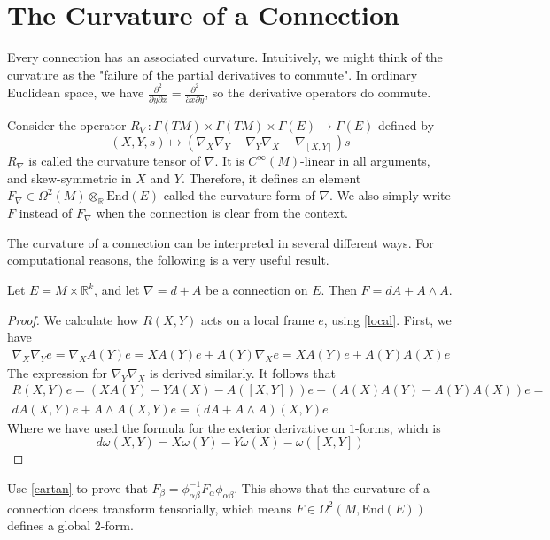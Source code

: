 \section{The Curvature of a Connection}

Every connection has an associated curvature. Intuitively, we might think of the curvature as the "failure of the partial derivatives to commute". In ordinary Euclidean space, we have $\frac{\partial^2}{\partial y\partial x}=\frac{\partial^2}{\partial x\partial y}$, so the derivative operators do commute.
\begin{definition}
  Consider the operator $R_\nabla:\Gamma(TM)\times\Gamma(TM)\times\Gamma(E)\to\Gamma(E)$ defined by
  $$(X,Y,s)\mapsto(\nabla_X\nabla_Y-\nabla_Y\nabla_X-\nabla_{[X,Y]})s$$
  $R_\nabla$ is called the curvature tensor of $\nabla$. It is $C^\infty(M)$-linear in all arguments, and skew-symmetric in $X$ and $Y$. Therefore, it defines an element $F_\nabla\in\Omega^2(M)\otimes_\mathbb{R}\text{End}(E)$ called the curvature form of $\nabla$. We also simply write $F$ instead of $F_\nabla$ when the connection is clear from the context.
\end{definition}
The curvature of a connection can be interpreted in several different ways. For computational reasons, the following is a very useful result.
\begin{theorem}\label{cartan}
  Let $E=M\times\mathbb{R}^k$, and let $\nabla=d+A$ be a connection on $E$. Then $F=dA+A\wedge A$.
\end{theorem}
\begin{proof}
  We calculate how $R(X,Y)$ acts on a local frame $e$, using \ref{local}. First, we have
  \begin{align*}
    \nabla_X\nabla_Ye=\nabla_XA(Y)e=XA(Y)e+A(Y)\nabla_Xe=XA(Y)e+A(Y)A(X)e
  \end{align*}
  The expression for $\nabla_Y\nabla_X$ is derived similarly. It follows that
  \begin{align*}
    R(X,Y)e=(XA(Y)-YA(X)-A([X,Y]))e+(A(X)A(Y)-A(Y)A(X))e=\\dA(X,Y)e+A\wedge A(X,Y)e=
    (dA+A\wedge A)(X,Y)e
  \end{align*}
  Where we have used the formula for the exterior derivative on $1$-forms, which is $$d\omega(X,Y)=X\omega(Y)-Y\omega(X)-\omega([X,Y])$$
\end{proof}
\begin{exercise}
  Use \ref{cartan} to prove that $F_\beta=\phi^{-1}_{\alpha\beta}F_\alpha\phi_{\alpha\beta}$. This shows that the curvature of a connection doees transform tensorially, which means $F\in\Omega^2(M,\text{End}(E))$ defines a global $2$-form.
\end{exercise}
